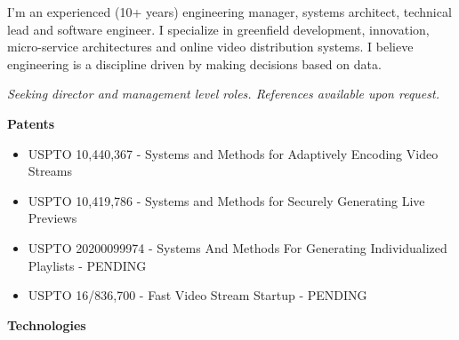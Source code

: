 \documentclass{article}
\begin{document}
I'm an experienced (10+ years) engineering manager, systems
architect, technical lead and software engineer. I specialize in
greenfield development, innovation, micro-service architectures and
online video distribution systems. I believe engineering is a
discipline driven by making decisions based on data.

\textit{Seeking director and management level roles. References available upon request.}

\vspace{10pt}\textbf{Patents}

\vspace{5pt}\begin{small}
\begin{itemize}[nosep,label=,leftmargin=*]
\item USPTO 10,440,367 - Systems and Methods for Adaptively Encoding Video Streams
\item USPTO 10,419,786 - Systems and Methods for Securely Generating Live Previews
\item USPTO 20200099974 - Systems And Methods For Generating Individualized Playlists - {\tiny PENDING}
\item USPTO 16/836,700 - Fast Video Stream Startup - {\tiny PENDING}
\end{itemize}
\end{small}

\vspace{10pt}\textbf{Technologies}
\end{document}
